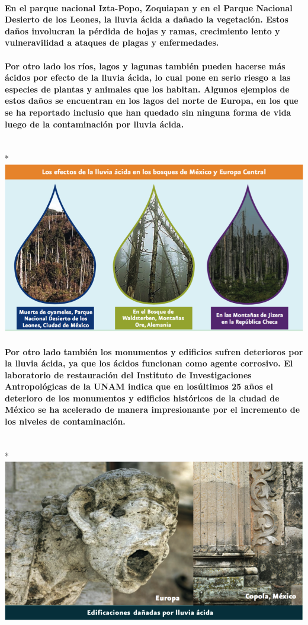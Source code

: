 \paragraph {En el parque nacional Izta-Popo, Zoquiapan y en el Parque Nacional Desierto de los Leones, la lluvia ácida a dañado la vegetación. Estos daños involucran la pérdida de hojas y ramas, crecimiento lento y vulneravilidad a ataques de plagas y enfermedades.}
\paragraph {Por otro lado los ríos, lagos y lagunas también pueden hacerse más ácidos por efecto de la lluvia ácida, lo cual pone en serio riesgo a las especies de plantas y animales que los habitan. Algunos ejemplos de estos daños se encuentran en los lagos del norte de Europa, en los que se ha reportado inclusio que han quedado sin ninguna forma de vida luego de la contaminación por lluvia ácida.}
~\\*
\includegraphics[]{./images/2.png}
\paragraph {Por otro lado también los monumentos y edificios sufren deterioros por la lluvia ácida, ya que los ácidos funcionan como agente corrosivo. El laboratorio de restauración del Instituto de Investigaciones Antropológicas de la UNAM indica que en losúltimos 25 años el deterioro de los monumentos y edificios históricos de la ciudad de México se ha acelerado de manera impresionante por el incremento de los niveles de contaminación.}
~\\*
\includegraphics[]{./images/3.png}
